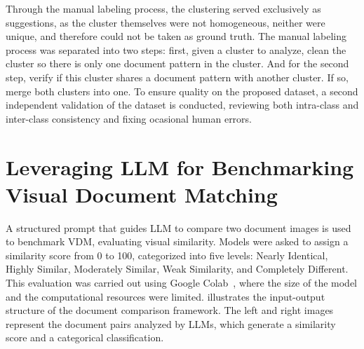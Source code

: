 Through the manual labeling process, the clustering served exclusively as suggestions, as the cluster themselves were not homogeneous, neither were unique, and therefore could not be taken as ground truth. The manual labeling process was separated into two steps: first, given a cluster to analyze, clean the cluster so there is only one document pattern in the cluster. And for the second step, verify if this cluster shares a document pattern with another cluster. If so, merge both clusters into one. To ensure quality on the proposed dataset, a second independent validation of the dataset is conducted, reviewing both intra-class and inter-class consistency and fixing ocasional human errors.

\section{Leveraging LLM for Benchmarking Visual Document Matching}
\label{sec:method_benchmark}

A structured prompt that guides \gls{LLM} to compare two document images is used to benchmark \gls{VDM}, evaluating visual similarity. Models were asked to assign a similarity score from 0 to 100, categorized into five levels: Nearly Identical, Highly Similar, Moderately Similar, Weak Similarity, and Completely Different. This evaluation was carried out using Google Colab~\cite{research_google_2024}, where the size of the model and the computational resources were limited.  illustrates the input-output structure of the document comparison framework. The left and right images represent the document pairs analyzed by \glspl{LLM}, which generate a similarity score and a categorical classification.


